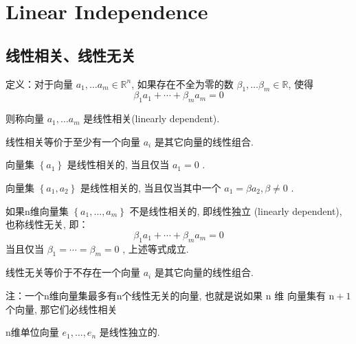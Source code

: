 \chapter{Linear Independence}

\section{线性相关、线性无关}

\begin{definition}
    定义：对于向量 $ a_{1}, \ldots a_{m} \in \mathbb{R}^{n} $, 如果存在不全为零的数 $ \beta_{1}, \ldots \beta_{m} \in \mathbb{R} $, 使得
$$
\beta_{1} a_{1}+\cdots+\beta_{m} a_{m}=0
$$

则称向量 $ a_{1}, \ldots a_{m} $ 是线性相关(linearly dependent). 
\end{definition}

线性相关等价于至少有一个向量 $ a_{i} $ 是其它向量的线性组合. 

\begin{corollary}
    向量集 $ \left\{a_{1}\right\} $ 是线性相关的, 当且仅当 $ a_{1}=0 $ . 

    向量集 $ \left\{a_{1}, a_{2}\right\} $ 是线性相关的,  当且仅当其中一个 $ a_{1}=\beta a_{2}, \beta \neq 0 $ . 
\end{corollary}

\begin{definition}
    \label{Def:LinearIndependence}
    如果n维向量集 $ \left\{a_{1}, \ldots, a_{m}\right\} $ 不是线性相关的, 即线性独立 (linearly dependent), 也称线性无关,  即：
$$
\beta_{1} a_{1}+\cdots+\beta_{m} a_{m}=0
$$
当且仅当 $ \beta_{1}=\cdots=\beta_{m}=0 $ , 上述等式成立. 
\end{definition}

线性无关等价于不存在一个向量 $ a_{i} $ 是其它向量的线性组合. 

\begin{corollary}
    注：一个n维向量集最多有n个线性无关的向量, 也就是说如果 $ \mathrm{n} $ 维 向量集有 $ \mathrm{n}+1 $ 个向量, 那它们必线性相关
\end{corollary}

\begin{example}
    n维单位向量 $ e_{1}, \ldots, e_{n} $ 是线性独立的. 
\end{example}

